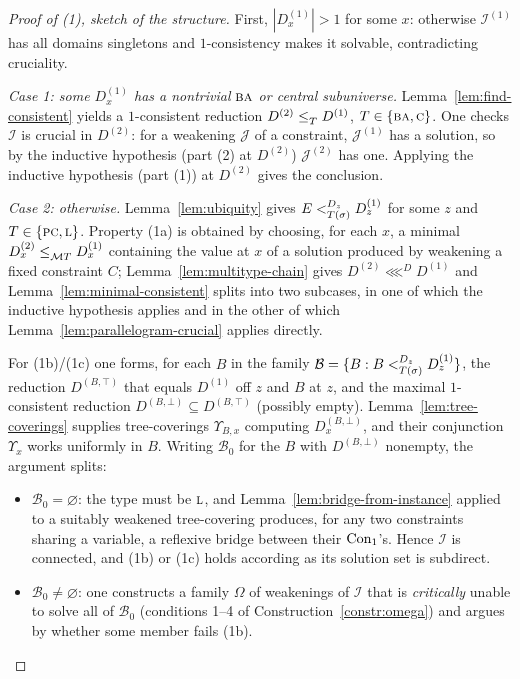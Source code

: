 \begin{proof}[Proof of \textup{(1)}, sketch of the structure]
First, $|D^{(1)}_{x}|>1$ for some $x$: otherwise $\mathcal I^{(1)}$ has all
domains singletons and $1$-consistency makes it solvable, contradicting
cruciality.

\emph{Case 1: some $D^{(1)}_{x}$ has a nontrivial $\TBA$ or central
subuniverse.} Lemma~\ref{lem:find-consistent} yields a $1$-consistent reduction
$D^{(2)}\subte{T}D^{(1)}$, $T\in\{\TBA,\TC\}$. One checks $\mathcal I$ is
crucial in $D^{(2)}$: for a weakening $\mathcal J$ of a constraint,
$\mathcal J^{(1)}$ has a solution, so by the inductive hypothesis (part (2) at
$D^{(2)}$) $\mathcal J^{(2)}$ has one. Applying the inductive hypothesis
(part (1)) at $D^{(2)}$ gives the conclusion.

\emph{Case 2: otherwise.} Lemma~\ref{lem:ubiquity} gives
$E\subt[D_{z}]{T(\sigma)}D^{(1)}_{z}$ for some $z$ and $T\in\{\TPC,\TL\}$.
Property (1a) is obtained by choosing, for each $x$, a minimal
$D^{(2)}_{x}\subte{\MT T}D^{(1)}_{x}$ containing the value at $x$ of a solution
produced by weakening a fixed constraint $C$; Lemma~\ref{lem:multitype-chain}
gives $D^{(2)}\lll^{D}D^{(1)}$ and
Lemma~\ref{lem:minimal-consistent} splits into two subcases, in one of which the
inductive hypothesis applies and in the other of which
Lemma~\ref{lem:parallelogram-crucial} applies directly.

For (1b)/(1c) one forms, for each $B$ in the family
$\mathcal B=\{B:B\subt[D_{z}]{T(\sigma)}D^{(1)}_{z}\}$, the reduction
$D^{(B,\top)}$ that equals $D^{(1)}$ off $z$ and $B$ at $z$, and the maximal
$1$-consistent reduction $D^{(B,\bot)}\subseteq D^{(B,\top)}$ (possibly empty).
Lemma~\ref{lem:tree-coverings} supplies tree-coverings $\Upsilon_{B,x}$
computing $D^{(B,\bot)}_{x}$, and their conjunction $\Upsilon_{x}$ works
uniformly in $B$. Writing $\mathcal B_{0}$ for the $B$ with $D^{(B,\bot)}$
nonempty, the argument splits:
\begin{itemize}\tightlist
\item $\mathcal B_{0}=\varnothing$: the type must be $\TL$, and
  Lemma~\ref{lem:bridge-from-instance} applied to a suitably weakened
  tree-covering produces, for any two constraints sharing a variable, a
  reflexive bridge between their $\ConOne$'s. Hence $\mathcal I$ is connected,
  and (1b) or (1c) holds according as its solution set is subdirect.
\item $\mathcal B_{0}\neq\varnothing$: one constructs a family $\Omega$ of
  weakenings of $\mathcal I$ that is \emph{critically} unable to solve all of
  $\mathcal B_{0}$ (conditions 1--4 of
  Construction~\ref{constr:omega}) and argues by whether some member fails
  (1b).
\end{itemize}
\end{proof}

